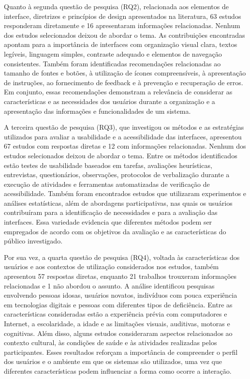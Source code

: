 Quanto à segunda questão de pesquisa (RQ2), relacionada aos elementos de interface, diretrizes e princípios de design apresentados na literatura, 63 estudos responderam diretamente e 16 apresentaram informações relacionadas. Nenhum dos estudos selecionados deixou de abordar o tema. As contribuições encontradas apontam para a importância de interfaces com organização visual clara, textos legíveis, linguagem simples, contraste adequado e elementos de navegação consistentes. Também foram identificadas recomendações relacionadas ao tamanho de fontes e botões, à utilização de ícones compreensíveis, à apresentação de instruções, ao fornecimento de feedback e à prevenção e recuperação de erros. Em conjunto, essas recomendações demonstram a relevância de considerar as características e as necessidades dos usuários durante a organização e a apresentação das informações e funcionalidades de um sistema.

A terceira questão de pesquisa (RQ3), que investigou os métodos e as estratégias utilizados para avaliar a usabilidade e a acessibilidade das interfaces, apresentou 67 estudos com respostas diretas e 12 com informações relacionadas. Nenhum dos estudos selecionados deixou de abordar o tema. Entre os métodos identificados estão testes de usabilidade baseados em tarefas, avaliações heurísticas, entrevistas, questionários, observações, protocolos de verbalização durante a execução de atividades e ferramentas automatizadas de verificação de acessibilidade. Também foram encontrados estudos que utilizaram experimentos e análises estatísticas, além de abordagens participativas, nas quais os usuários contribuíram para a identificação de necessidades e para a avaliação das interfaces. Essa variedade evidencia que diferentes métodos podem ser empregados de acordo com os objetivos da avaliação e as características do público investigado.

Por sua vez, a quarta questão de pesquisa (RQ4), voltada às características dos usuários e aos contextos de utilização considerados nos estudos, também apresentou 57 respostas diretas, enquanto 21 trabalhos trouxeram informações relacionadas e 1 não abordou o assunto. A análise identificou pesquisas envolvendo pessoas idosas, usuários novatos, indivíduos com pouca experiência em tecnologias digitais e pessoas com diferentes tipos de deficiência. Entre as características consideradas estão a experiência prévia com computadores e Internet, a escolaridade, a idade e as limitações visuais, auditivas, motoras e cognitivas. Além disso, alguns estudos consideraram aspectos relacionados ao contexto cultural, às condições de saúde e às atividades realizadas pelos participantes. Esses resultados reforçam a importância de compreender o perfil dos usuários e o ambiente em que os sistemas são utilizados, uma vez que diferentes características podem influenciar a forma como ocorre a interação.

